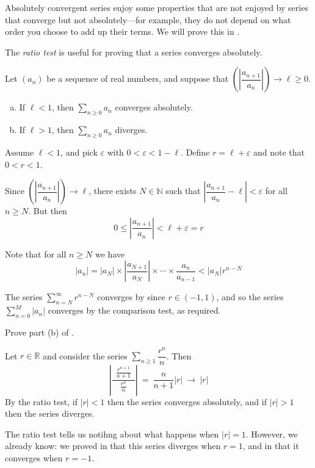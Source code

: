Absolutely convergent series enjoy some properties that are not enjoyed by series that converge but not absolutely---for example, they do not depend on what order you choose to add up their terms. We will prove this in .

The \textit{ratio test} is useful for proving that a series converges absolutely.

\begin{theorem}
\label{thmRatioTest}
Let $(a_n)$ be a sequence of real numbers, and suppose that $\left( \left| \dfrac{a_{n+1}}{a_n} \right| \right) \to \ell \ge 0$.
\begin{enumerate}[(a)]
\item If $\ell < 1$, then $\displaystyle \sum_{n \ge 0} a_n$ converges absolutely.
\item If $\ell > 1$, then $\displaystyle \sum_{n \ge 0} a_n$ diverges.
\end{enumerate}
\end{theorem}

\begin{cproof}[of {(a)}]
Assume $\ell < 1$, and pick $\varepsilon$ with $0 < \varepsilon < 1-\ell$. Define $r = \ell + \varepsilon$ and note that $0 < r < 1$.

Since $\left( \left| \dfrac{a_{n+1}}{a_n} \right| \right) \to \ell$, there exists $N \in \mathbb{N}$ such that $\left| \dfrac{a_{n+1}}{a_n} - \ell \right| < \varepsilon$ for all $n \ge N$. But then
\[ 0 \le \left| \dfrac{a_{n+1}}{a_n} \right| < \ell + \varepsilon = r \]

Note that for all $n \ge N$ we have
\[ |a_n| = |a_N| \times \left| \dfrac{a_{N+1}}{a_N} \right| \times \cdots \times \dfrac{a_n}{a_{n-1}} < |a_N| r^{n-N} \]

The series $\sum_{n=N}^{\infty} r^{n-N}$ converges by  since $r \in (-1,1)$, and so the series $\sum_{n=0}^M |a_n|$ converges by the comparison test, as required.
\end{cproof}

\begin{exercise}
Prove part (b) of .
\end{exercise}

\begin{example}
Let $r \in \mathbb{R}$ and consider the series $\sum_{n \ge 1} \dfrac{r^n}{n}$. Then
\[ \left| \dfrac{~~\frac{r^{n+1}}{n+1}~~}{\frac{r^n}{n}} \right| ~=~ \dfrac{n}{n+1} |r| ~\to~ |r| \]
By the ratio test, if $|r| < 1$ then the series converges absolutely, and if $|r| > 1$ then the series diverges.

The ratio test tells us notihng about what happens when $|r| = 1$. However, we already know: we proved in  that this series diverges when $r=1$, and in  that it converges when $r=-1$.
\end{example}

